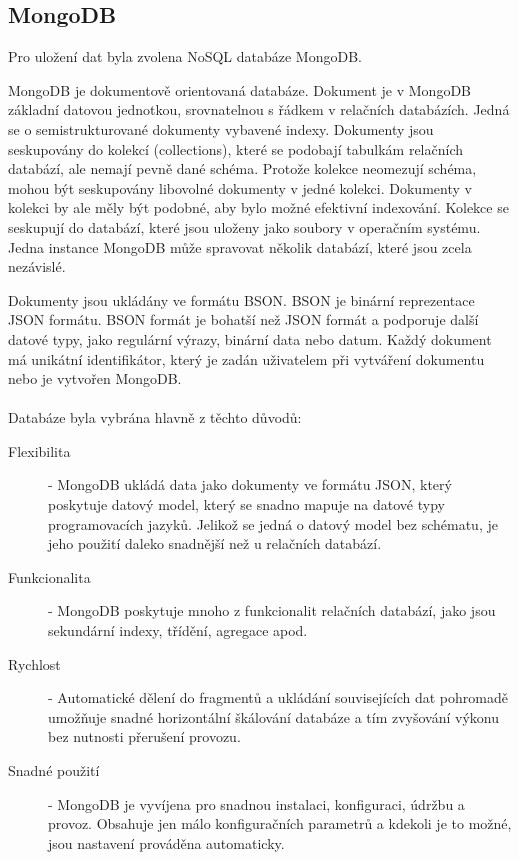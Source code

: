 \documentclass[czech,BP]{thesiskiv}
\begin{document}
		\subsection{MongoDB}
		Pro uložení dat byla zvolena NoSQL databáze MongoDB.
		
MongoDB je dokumentově orientovaná databáze. Dokument je v MongoDB základní datovou jednotkou, srovnatelnou s řádkem v relačních databázích. Jedná se o semistrukturované dokumenty vybavené indexy. Dokumenty jsou seskupovány do kolekcí (collections), které se podobají tabulkám relačních databází, ale nemají pevně dané schéma. Protože kolekce neomezují schéma, mohou být seskupovány libovolné dokumenty v jedné kolekci. Dokumenty v kolekci by ale měly být podobné, aby bylo možné efektivní indexování. Kolekce se seskupují do databází, které jsou uloženy jako soubory v operačním systému. Jedna instance MongoDB může spravovat několik databází, které jsou zcela nezávislé.\cite{houvzvivcka2012aplikace}

Dokumenty jsou ukládány ve formátu BSON. BSON je binární reprezentace JSON formátu. BSON formát je bohatší než JSON formát a podporuje další datové typy, jako regulární výrazy, binární data nebo datum. Každý dokument má unikátní identifikátor, který je zadán uživatelem při vytváření dokumentu nebo je vytvořen MongoDB.\cite{houvzvivcka2012aplikace}\\
\\
Databáze byla vybrána hlavně z těchto důvodů:
\begin{description}
\item [Flexibilita]
- MongoDB ukládá data jako dokumenty ve formátu JSON, který poskytuje datový model, který se snadno mapuje na datové typy programovacích jazyků. Jelikož se jedná o datový model bez schématu, je jeho použití daleko snadnější než u relačních databází.\cite{houvzvivcka2012aplikace}

\item [Funkcionalita] - MongoDB poskytuje mnoho z funkcionalit relačních databází, jako jsou sekundární indexy, třídění, agregace apod.\cite{houvzvivcka2012aplikace}
\item [Rychlost] - Automatické dělení do fragmentů a ukládání souvisejících dat pohromadě umožňuje snadné horizontální škálování databáze a tím zvyšování výkonu bez nutnosti přerušení provozu.\cite{houvzvivcka2012aplikace}
\item [Snadné použití] - MongoDB je vyvíjena pro snadnou instalaci, konfiguraci, údržbu a provoz. Obsahuje jen málo konfiguračních parametrů a kdekoli je to možné, jsou nastavení prováděna automaticky.\cite{houvzvivcka2012aplikace}
\end{description}
\end{document}

